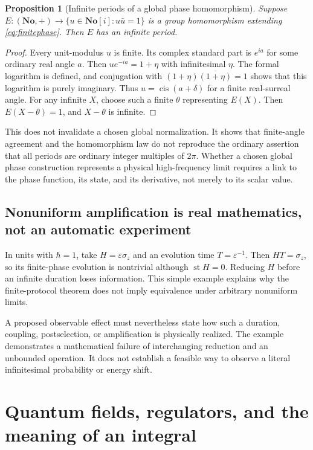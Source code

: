 \documentclass[11pt,a4paper]{article}
\numberwithin{equation}{section}
\newtheorem{proposition}[theorem]{Proposition}
\theoremstyle{definition}
\theoremstyle{remark}
\newcommand{\No}{\mathbf{No}}
\newcommand{\SC}{\No[i]}
\newcommand{\eps}{\varepsilon}
\DeclareMathOperator{\st}{st}
\DeclareMathOperator{\cis}{cis}
\begin{document}
\begin{proposition}[Infinite periods of a global phase homomorphism]\label{prop:periods}
Suppose $E:(\No,+)\to\{u\in\SC:u\bar u=1\}$ is a group homomorphism extending \eqref{eq:finitephase}. Then $E$ has an infinite period.
\end{proposition}
\begin{proof}
Every unit-modulus $u$ is finite. Its complex standard part is $e^{ia}$ for some ordinary real angle $a$. Then $ue^{-ia}=1+\eta$ with infinitesimal $\eta$. The formal logarithm is defined, and conjugation with $(1+\eta)\overline{(1+\eta)}=1$ shows that this logarithm is purely imaginary. Thus $u=\cis(a+\delta)$ for a finite real-surreal angle. For any infinite $X$, choose such a finite $\theta$ representing $E(X)$. Then $E(X-\theta)=1$, and $X-\theta$ is infinite.
\end{proof}

This does not invalidate a chosen global normalization. It shows that finite-angle agreement and the homomorphism law do not reproduce the ordinary assertion that all periods are ordinary integer multiples of $2\pi$. Whether a chosen global phase construction represents a physical high-frequency limit requires a link to the phase function, its state, and its derivative, not merely to its scalar value.

\subsection{Nonuniform amplification is real mathematics, not an automatic experiment}
In units with $\hbar=1$, take $H=\eps\sigma_z$ and an evolution time $T=\eps^{-1}$. Then $HT=\sigma_z$, so its finite-phase evolution is nontrivial although $\st H=0$. Reducing $H$ before an infinite duration loses information. This simple example explains why the finite-protocol theorem does not imply equivalence under arbitrary nonuniform limits.

A proposed observable effect must nevertheless state how such a duration, coupling, postselection, or amplification is physically realized. The example demonstrates a mathematical failure of interchanging reduction and an unbounded operation. It does not establish a feasible way to observe a literal infinitesimal probability or energy shift.

\section{Quantum fields, regulators, and the meaning of an integral}
\label{sec:qft}
\end{document}
